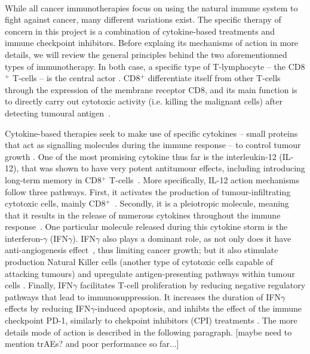 \documentclass[11pt]{article}
\begin{document}
~
\par While all cancer immunotherapies focus on using the natural immune system to fight against cancer, many different variations exist. The specific therapy of concern in this project is a combination of cytokine-based treatments and immune checkpoint inhibitors. Before explaing its mechanisms of action in more details, we will review the general principles behind the two aforementionned types of immunotherapy. In both case, a specific type of T-lymphocyte -- the CD8$^+$ T-cells -- is the central actor \cite{ReviewCPI}. CD8$^+$ differentiate itself from other T-cells through the expression of the membrane receptor CD8, and its main function is to directly carry out cytotoxic activity (i.e. killing the malignant cells) after detecting tumoural antigen~\cite{cd8Effects}.
\par Cytokine-based therapies seek to make use of specific cytokines -- small proteins that act as signalling molecules during the immune response -- to control tumour growth \cite{ioDef}. One of the most promising cytokine thus far is the interleukin-12 (IL-12), that was shown to have very potent antitumour effects, including introducing long-term memory in CD8$^+$ T-cells~\cite{il12IsCool}. More specifically, IL-12 action mechanisms follow three pathways. First, it activates the production of tumour-infiltrating cytotoxic cells, mainly CD8$^+$~\cite{cd8FirstWay}. Secondly, it is a pleiotropic molecule, meaning that it results in the release of numerous cytokines throughout the immune response~\cite{il12CytokineStorm}. One particular molecule released during this cytokine storm is the interferon-$\gamma$ (IFN$\gamma$). IFN$\gamma$ also plays a dominant role, as not only does it have anti-angiogenesis effect~\cite{ifngAngiogenesis}, thus limiting cancer growth; but it also stimulate production Natural Killer cells \cite{ifngNKProd} (another type of cytotoxic cells capable of attacking tumours) and upregulate antigen-presenting pathways within tumour cells \cite{ifngAntigenExposure}. Finally, IFN$\gamma$ facilitates T-cell proliferation by reducing negative regulatory pathways that lead to immunosuppression. It  increases the duration of IFN$\gamma$ effects by reducing IFN$\gamma$-induced apoptosis, and inhibts the effect of the immune checkpoint PD-1, similarly to chekpoint inhibitors (CPI) treatments \cite{reducImmunoSuppression}. The more details mode of action is described in the following paragraph. [maybe need to mention trAEs? and poor performance so far...]
\end{document}
